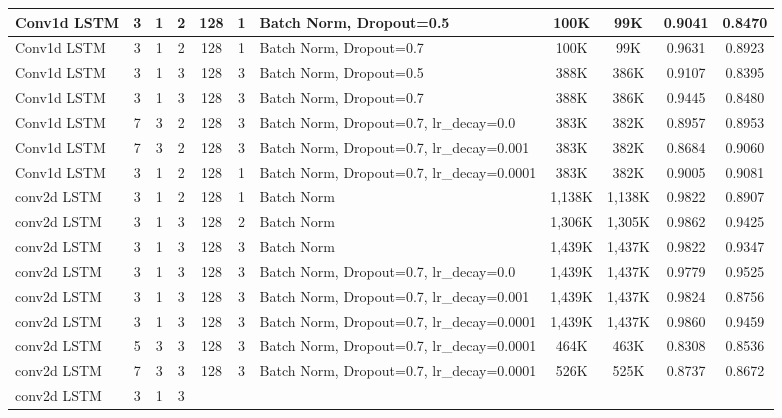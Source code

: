 \documentclass{article}
\begin{document}
\begin{table}
{\begin{tabular} { |m{2.5cm}|c|c|c|c|c|m{3.5cm}|c|c|c|c| }
      \hline
      Conv1d LSTM & 3 & 1 & 2 &
      128 & 1 & Batch Norm, Dropout=0.5 &
      100K & 99K & 0.9041 & 0.8470 \\ \hline
      Conv1d LSTM & 3 & 1 & 2 &
      128 & 1 & Batch Norm, Dropout=0.7 &
      100K & 99K & 0.9631 & 0.8923 \\ \hline
      Conv1d LSTM & 3 & 1 & 3 &
      128 & 3 & Batch Norm, Dropout=0.5 &
      388K & 386K & 0.9107 & 0.8395 \\ \hline
      Conv1d LSTM & 3 & 1 & 3 &
      128 & 3 & Batch Norm, Dropout=0.7 &
      388K & 386K & 0.9445 & 0.8480 \\ \hline
      \hline
      Conv1d LSTM & 7 & 3 & 2 &
      128 & 3 & Batch Norm, Dropout=0.7, lr\_decay=0.0 &
      383K & 382K & 0.8957 & 0.8953 \\ \hline
      Conv1d LSTM & 7 & 3 & 2 &
      128 & 3 & Batch Norm, Dropout=0.7, lr\_decay=0.001 &
      383K & 382K & 0.8684 & 0.9060 \\ \hline
      Conv1d LSTM & 3 & 1 & 2 &
      128 & 1 & Batch Norm, Dropout=0.7, lr\_decay=0.0001 &
      383K & 382K & 0.9005 & 0.9081 \\ \hline
      \hline
      conv2d LSTM & 3 & 1 & 2 &
      128 & 1 & Batch Norm &
      1,138K & 1,138K & 0.9822 & 0.8907 \\ \hline
      conv2d LSTM & 3 & 1 & 3 &
      128 & 2 & Batch Norm &
      1,306K & 1,305K & 0.9862 & 0.9425 \\ \hline
      conv2d LSTM & 3 & 1 & 3 &
      128 & 3 & Batch Norm &
      1,439K & 1,437K & 0.9822 & 0.9347 \\ \hline
      \hline
      conv2d LSTM & 3 & 1 & 3 &
      128 & 3 & Batch Norm, Dropout=0.7, lr\_decay=0.0 &
      1,439K & 1,437K & 0.9779 & 0.9525 \\ \hline
      conv2d LSTM & 3 & 1 & 3 &
      128 & 3 & Batch Norm, Dropout=0.7, lr\_decay=0.001 &
      1,439K & 1,437K & 0.9824 & 0.8756 \\ \hline
      conv2d LSTM & 3 & 1 & 3 &
      128 & 3 & Batch Norm, Dropout=0.7, lr\_decay=0.0001 &
      1,439K & 1,437K & 0.9860 & 0.9459 \\ \hline
      \hline
      conv2d LSTM & 5 & 3 & 3 &
      128 & 3 & Batch Norm, Dropout=0.7, lr\_decay=0.0001 &
      464K & 463K & 0.8308 & 0.8536 \\ \hline
      conv2d LSTM & 7 & 3 & 3 &
      128 & 3 & Batch Norm, Dropout=0.7, lr\_decay=0.0001 &
      526K & 525K & 0.8737 & 0.8672 \\ \hline
      \hline
      conv2d LSTM & 3 & 1 & 3 &

\end{tabular}}
\end{table}
\end{document}
